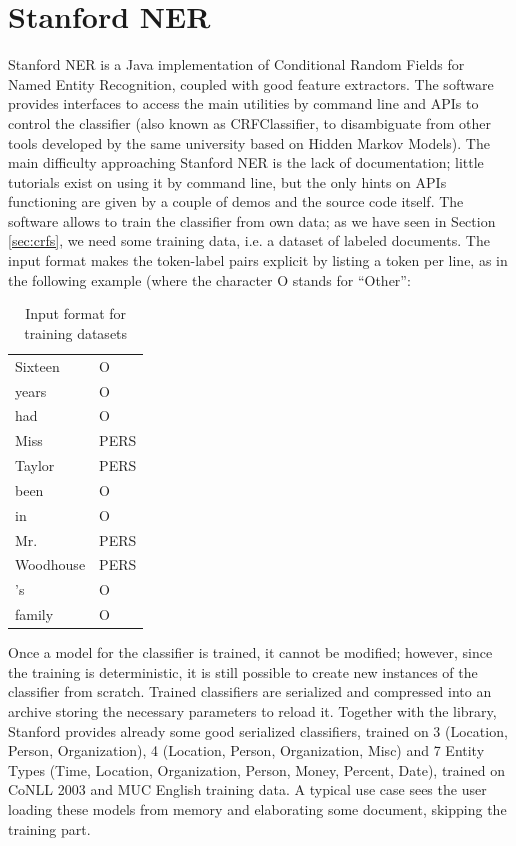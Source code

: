 \documentclass[a4paper,11pt]{report}
\begin{document}
\section{Stanford NER}
\label{sec:StfdNER}
Stanford NER \cite{finkel2005incorporating} is a Java implementation of Conditional Random Fields for Named Entity Recognition, coupled with good feature extractors. The software provides interfaces to access the main utilities by command line and APIs to control the classifier (also known as CRFClassifier, to disambiguate from other tools developed by the same university based on Hidden Markov Models).
The main difficulty approaching Stanford NER is the lack of documentation; little tutorials exist on using it by command line, but the only hints on APIs functioning are given by a couple of demos and the source code itself.
The software allows to train the classifier from own data; as we have seen in Section \ref{sec:crfs}, we need some training data, i.e. a dataset of labeled documents. The input format makes the token-label pairs explicit by listing a token per line, as in the following example (where the character O stands for ``Other'':\\
\begin{table}[H]
\begin{center}
\begin{tabular}{ll}
Sixteen &	O\\
years	& O\\
had	&O\\
Miss	&PERS\\
Taylor	&PERS\\
been	&O\\
in	&O\\
Mr.	&PERS\\
Woodhouse	&PERS\\
's	&O\\
family	&O\\
\end{tabular}
\end{center}
\caption{Input format for training datasets}
\label{tab:inputfmt}
\end{table}
Once a model for the classifier is trained, it cannot be modified; however, since the training is deterministic, it is still possible to create new instances of the classifier from scratch. Trained classifiers are serialized and compressed into an archive storing the necessary parameters to reload it.
Together with the library, Stanford provides already some good serialized classifiers, trained on 3 (Location, Person, Organization), 4 (Location, Person, Organization, Misc) and 7 Entity Types (Time, Location, Organization, Person, Money, Percent, Date), trained on CoNLL 2003 and MUC English training data. A typical use case sees the user loading these models from memory and elaborating some document, skipping the training part.
\end{document}
